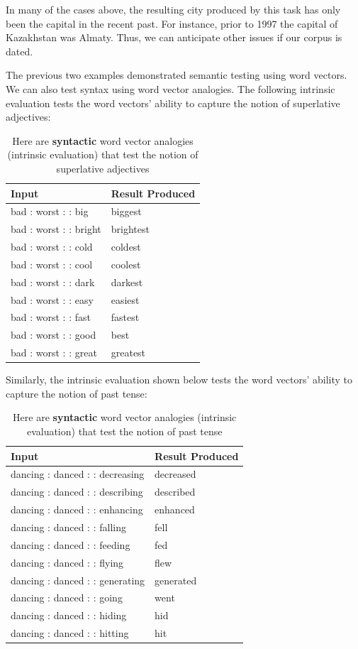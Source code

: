 \documentclass{tufte-handout}
\begin{document}
In many of the cases above, the resulting city produced by this task has only been the capital in the recent past. For instance, prior to 1997 the capital of Kazakhstan was Almaty. Thus, we can anticipate other issues if our corpus is dated.

The previous two examples demonstrated semantic testing using word vectors. We can also test syntax using word vector analogies. The following intrinsic evaluation tests the word vectors' ability to capture the notion of superlative adjectives:

\begin{table}[ht]
  \centering
  \selectfont
  \begin{tabular}{ll}
    \toprule
    Input & Result Produced \\
    \midrule
	bad : worst : : big & biggest\\
	bad : worst : : bright & brightest \\
	bad : worst : : cold & coldest \\
	bad : worst : : cool & coolest \\
	bad : worst : : dark & darkest \\
	bad : worst : : easy & easiest \\
	bad : worst : : fast & fastest\\
	bad : worst : : good & best\\
	bad : worst : : great & greatest\\
    \bottomrule
  \end{tabular}
  \caption{Here are \textbf{syntactic} word vector analogies (intrinsic evaluation) that test the notion of superlative adjectives}
  \label{tab:normaltab}
\end{table}

Similarly, the intrinsic evaluation shown below tests the word vectors' ability to capture the notion of past tense:  

\begin{table}[ht]
  \centering
  \selectfont
  \begin{tabular}{ll}
    \toprule
    Input & Result Produced \\
    \midrule
	dancing : danced : : decreasing & decreased \\
	dancing : danced : : describing & described \\
	dancing : danced : : enhancing & enhanced \\
	dancing : danced : : falling & fell\\
	dancing : danced : : feeding & fed\\
	dancing : danced : : flying & flew\\
	dancing : danced : : generating & generated \\
	dancing : danced : : going & went\\
	dancing : danced : : hiding & hid\\
	dancing : danced : : hitting & hit\\
    \bottomrule
  \end{tabular}
  \caption{Here are \textbf{syntactic} word vector analogies (intrinsic evaluation) that test the notion of past tense}
  \label{tab:normaltab}
\end{table}
\end{document}
